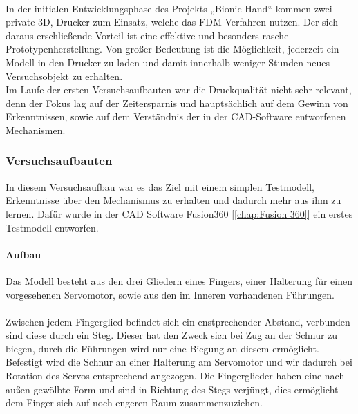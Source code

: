 \documentclass[titlepage,12pt,twoside]{article}
\begin{document}
\\
In der initialen Entwicklungsphase des Projekts „Bionic-Hand“ kommen zwei private 3D, 
Drucker zum Einsatz, welche das FDM-Verfahren nutzen. Der sich daraus erschließende 
Vorteil ist eine effektive und besonders rasche Prototypenherstellung. Von großer 
Bedeutung ist die Möglichkeit, jederzeit ein Modell in den Drucker zu laden und damit 
innerhalb weniger Stunden neues Versuchsobjekt zu erhalten. \\
Im Laufe der ersten Versuchsaufbauten war die Druckqualität nicht sehr relevant, denn 
der Fokus lag auf der Zeitersparnis und hauptsächlich auf dem Gewinn von Erkenntnissen, 
sowie auf dem Verständnis der in der CAD-Software entworfenen Mechanismen. \\

\subsubsection{Versuchsaufbauten}
\label{chap:Versuchsaufbauten}
In diesem Versuchsaufbau war es das Ziel mit einem simplen Testmodell, Erkenntnisse über 
den Mechanismus zu erhalten und dadurch mehr aus ihm zu lernen. 
Dafür wurde in der CAD Software Fusion360 [\textcolor{blue}{\autoref{chap:Fusion 360}}] ein erstes Testmodell entworfen. \\

\paragraph{Aufbau}
\hfill \break
\hfill \break
Das Modell besteht aus den drei Gliedern eines Fingers, einer Halterung für einen vorgesehenen
Servomotor, sowie aus den im Inneren vorhandenen Führungen. \\
\\
Zwischen jedem Fingerglied befindet sich ein enstprechender Abstand, verbunden sind diese durch ein Steg. Dieser hat den Zweck sich bei Zug an der Schnur zu biegen, durch 
die Führungen wird nur eine Biegung an diesem ermöglicht. Befestigt wird die
Schnur an einer Halterung am Servomotor und wir dadurch bei Rotation des Servos 
entsprechend angezogen. Die Fingerglieder haben eine nach außen gewölbte Form und sind 
in Richtung des Stegs verjüngt, dies ermöglicht dem Finger sich auf noch engeren Raum 
zusammenzuziehen.
\end{document}
